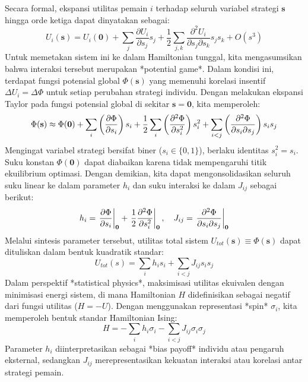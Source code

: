 \documentclass[12pt]{article}
\begin{document}
Secara formal, ekspansi utilitas pemain $i$ terhadap seluruh variabel strategi $\mathbf{s}$ hingga orde ketiga dapat dinyatakan sebagai:
\begin{equation}
U_i(\mathbf{s}) = U_i(\mathbf{0}) + \sum_j \frac{\partial U_i}{\partial s_j} s_j + \frac{1}{2} \sum_{j,k} \frac{\partial^2 U_i}{\partial s_j \partial s_k} s_j s_k + O(s^3) \tag{2}
\end{equation}
Untuk memetakan sistem ini ke dalam Hamiltonian tunggal, kita mengasumsikan bahwa interaksi tersebut merupakan *potential game*. Dalam kondisi ini, terdapat fungsi potensial global $\Phi(\mathbf{s})$ yang memenuhi korelasi insentif $\Delta U_i = \Delta \Phi$ untuk setiap perubahan strategi individu. Dengan melakukan ekspansi Taylor pada fungsi potensial global di sekitar $\mathbf{s}=\mathbf{0}$, kita memperoleh:
\begin{equation}
\Phi(\mathbf{s}) \approx \Phi(\mathbf{0}) + \sum_i \left( \frac{\partial \Phi}{\partial s_i} \right) s_i + \frac{1}{2} \sum_i \left( \frac{\partial^2 \Phi}{\partial s_i^2} \right) s_i^2 + \sum_{i<j} \left( \frac{\partial^2 \Phi}{\partial s_i \partial s_j} \right) s_i s_j \notag
\end{equation}
Mengingat variabel strategi bersifat biner ($s_i \in \{0, 1\}$), berlaku identitas $s_i^2 = s_i$. Suku konstan $\Phi(\mathbf{0})$ dapat diabaikan karena tidak mempengaruhi titik ekuilibrium optimasi. Dengan demikian, kita dapat mengonsolidasikan seluruh suku linear ke dalam parameter $h_i$ dan suku interaksi ke dalam $J_{ij}$ sebagai berikut:
\begin{equation}
h_i = \left. \frac{\partial \Phi}{\partial s_i} \right|_{\mathbf{0}} + \left. \frac{1}{2} \frac{\partial^2 \Phi}{\partial s_i^2} \right|_{\mathbf{0}}, \quad J_{ij} = \left. \frac{\partial^2 \Phi}{\partial s_i \partial s_j} \right|_{\mathbf{0}} \notag
\end{equation}
Melalui sintesis parameter tersebut, utilitas total sistem $U_{tot}(\mathbf{s}) \equiv \Phi(\mathbf{s})$ dapat dituliskan dalam bentuk kuadratik standar:
\begin{equation}
U_{tot}(s) = \sum_i h_i s_i + \sum_{i<j} J_{ij} s_i s_j \tag{3}
\end{equation}
Dalam perspektif *statistical physics*, maksimisasi utilitas ekuivalen dengan minimisasi energi sistem, di mana Hamiltonian $H$ didefinisikan sebagai negatif dari fungsi utilitas ($H = -U$). Dengan menggunakan representasi *spin* $\sigma_i$, kita memperoleh bentuk standar Hamiltonian Ising:
\begin{equation}
H = - \sum_i h_i \sigma_i - \sum_{i<j} J_{ij}\sigma_i\sigma_j \tag{4}
\end{equation}
Parameter $h_i$ diinterpretasikan sebagai *bias payoff* individu atau pengaruh eksternal, sedangkan $J_{ij}$ merepresentasikan kekuatan interaksi atau korelasi antar strategi pemain.
\end{document}
